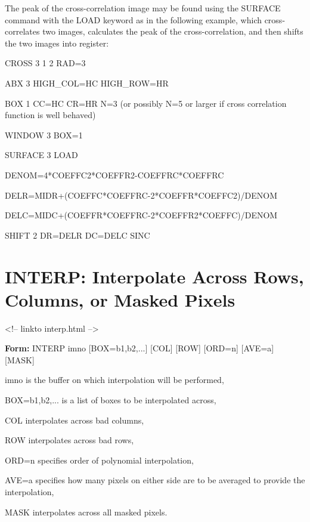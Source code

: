 The peak of the cross-correlation image may be found using the SURFACE
command with the LOAD keyword as in the following example, which
cross-correlates two images, calculates the peak of the cross-correlation,
and then shifts the two images into register:
\begin{hanging}
  \item{CROSS 3 1 2 RAD=3}
  \item{ABX 3 HIGH\_COL=HC HIGH\_ROW=HR}
  \item{BOX 1 CC=HC CR=HR N=3  (or possibly N=5 or larger if cross correlation
             function is well behaved)}
  \item{WINDOW 3 BOX=1}
  \item{SURFACE 3 LOAD}
  \item{DENOM=4*COEFFC2*COEFFR2-COEFFRC*COEFFRC}
  \item{DELR=MIDR+(COEFFC*COEFFRC-2*COEFFR*COEFFC2)/DENOM}
  \item{DELC=MIDC+(COEFFR*COEFFRC-2*COEFFR2*COEFFC)/DENOM}
  \item{SHIFT 2 DR=DELR DC=DELC SINC}
\end{hanging}

\section{INTERP: Interpolate Across Rows, Columns, or Masked Pixels}
\begin{rawhtml}
<!-- linkto interp.html -->
\end{rawhtml}

\begin{command}
  \item[\textbf{Form: }INTERP imno {[BOX=b1,b2,...]} {[COL]} {[ROW]} {[ORD=n]} {[AVE=a]} {[MASK]}\hfill]{}
  \item[imno]{is the buffer on which interpolation will be performed,}
  \item[BOX=b1,b2,...]{is a list of boxes to be interpolated across,}
  \item[COL]{interpolates across bad columns,}
  \item[ROW]{interpolates across bad rows,}
  \item[ORD=n]{specifies order of polynomial interpolation,}
  \item[AVE=a]{specifies how many pixels on either side are to be averaged 
       to provide the interpolation,}
  \item[MASK]{interpolates across all masked pixels.}
\end{command}

